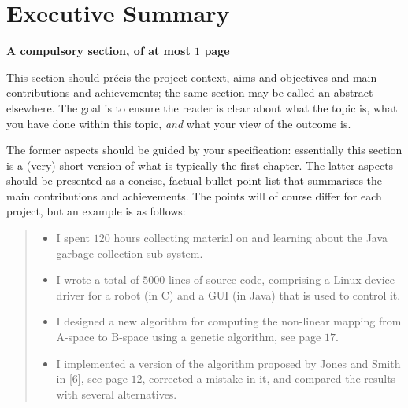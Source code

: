 \documentclass[ %
                    author={Sam Phippen},
                supervisor={Dr. Rafal Bogacz},
                     title={Real time voice activity detectors in noisy personal computing environments},
                  subtitle={},
                    degree={MEng},
                      year={2012} ]{thesis}
\begin{document}

\makedecl


\tableofcontents
\listoffigures
\listoftables
\listofalgorithms
\lstlistoflistings



\chapter*{Executive Summary}

{\bf A compulsory section, of at most $1$ page} 
\vspace{1cm} 

\noindent
This section should pr\'{e}cis the project context, aims and objectives 
and main contributions and achievements; the same section may be called
an abstract elsewhere.  The goal is to ensure the reader is clear about 
what the topic is, what you have done within this topic, {\em and} what 
your view of the outcome is.

The former aspects should be guided by your specification: essentially 
this section is a (very) short version of what is typically the first 
chapter.  The latter aspects should be presented as a concise, factual 
bullet point list that summarises the main contributions and achievements.  
The points will of course differ for each project, but an example is as 
follows:

\begin{quote}
\noindent
\begin{itemize}
\item I spent $120$ hours collecting material on and learning about the 
      Java garbage-collection sub-system. 
\item I wrote a total of $5000$ lines of source code, comprising a Linux 
      device driver for a robot (in C) and a GUI (in Java) that is 
      used to control it.
\item I designed a new algorithm for computing the non-linear mapping 
      from A-space to B-space using a genetic algorithm, see page $17$.
\item I implemented a version of the algorithm proposed by Jones and 
      Smith in [6], see page $12$, corrected a mistake in it, and 
      compared the results with several alternatives.
\end{itemize}
\end{quote}
\end{document}

